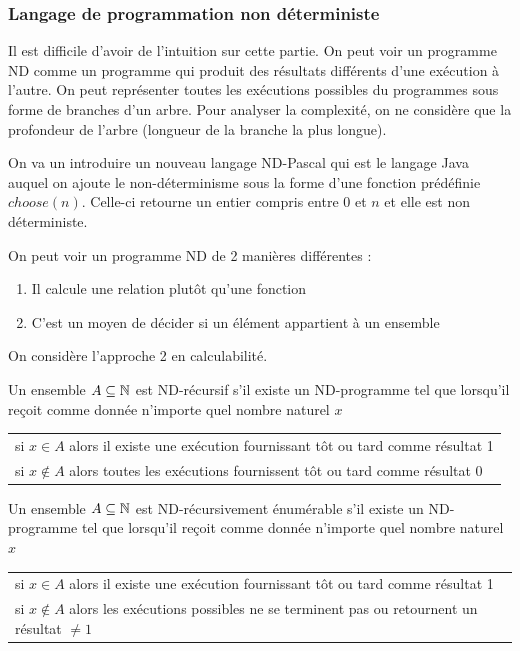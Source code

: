 
\subsubsection{Langage de programmation non déterministe}
\label{ssub:langague_de_programmation_non_d_terministe}

\begin{myrem}
	Il est difficile d'avoir de l'intuition sur cette partie. On peut 
	voir un programme ND comme un programme qui produit des résultats 
	différents d'une exécution à l'autre. On peut représenter toutes 
	les exécutions possibles du programmes sous forme de branches d'un
	arbre. Pour analyser la complexité, on ne 
	considère que la profondeur de l'arbre (longueur de la branche
	la plus longue).
\end{myrem}

On va un introduire un nouveau langage ND-Pascal qui est le langage Java 
auquel on ajoute le non-déterminisme sous la forme d'une fonction 
prédéfinie $choose(n)$. Celle-ci retourne un entier compris entre $0$ et $n$ et elle 
est non déterministe.

On peut voir un programme ND de 2 manières différentes :
\begin{enumerate}
	\item Il calcule une relation plutôt qu'une fonction
	\item C'est un moyen de décider si un élément appartient à un 
		ensemble
\end{enumerate}
On considère l'approche 2 en calculabilité.

\begin{mydef}[ND-récursif]
	Un ensemble $A \subseteq \mathbb{N}$ est ND-récursif s’il existe un 
	ND-programme tel que lorsqu'il reçoit comme donnée n'importe quel nombre 
	naturel $x$ \\
	\begin{tabular}{l}
	si $x \in A$ alors il existe une exécution fournissant tôt ou tard 
	comme résultat 1 \\
	si $x \notin A$ alors toutes les exécutions fournissent tôt ou tard 
	comme résultat 0 \\
	\end{tabular}
\end{mydef}

\begin{mydef}
	Un ensemble $A \subseteq \mathbb{N}$ est ND-récursivement énumérable s’il existe un 
	ND-programme tel que lorsqu'il reçoit comme donnée n'importe quel nombre 
	naturel $x$ \\
	\begin{tabular}{l}
	si $x \in A$ alors il existe une exécution fournissant tôt ou tard 
	comme résultat 1 \\
	si $x \notin A$ alors les exécutions possibles ne se terminent pas ou 
	retournent un résultat $\neq 1$ \\
	\end{tabular}
\end{mydef}

